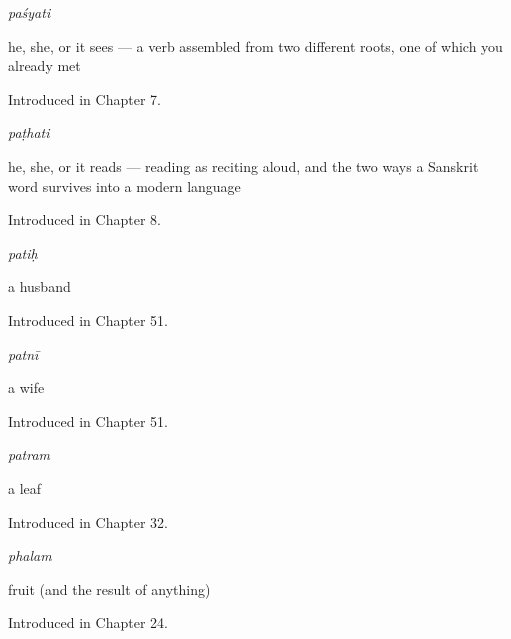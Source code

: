 \noindent\begin{minipage}[t]{\linewidth}
\raggedright
\textbf{}\enspace\emph{paśyati}\par
\small he, she, or it sees — a verb assembled from two different roots, one of which you already met\par
\footnotesize Introduced in Chapter 7.
\end{minipage}\par\medskip

\noindent\begin{minipage}[t]{\linewidth}
\raggedright
\textbf{}\enspace\emph{paṭhati}\par
\small he, she, or it reads — reading as reciting aloud, and the two ways a Sanskrit word survives into a modern language\par
\footnotesize Introduced in Chapter 8.
\end{minipage}\par\medskip

\noindent\begin{minipage}[t]{\linewidth}
\raggedright
\textbf{}\enspace\emph{patiḥ}\par
\small a husband\par
\footnotesize Introduced in Chapter 51.
\end{minipage}\par\medskip

\noindent\begin{minipage}[t]{\linewidth}
\raggedright
\textbf{}\enspace\emph{patnī}\par
\small a wife\par
\footnotesize Introduced in Chapter 51.
\end{minipage}\par\medskip

\noindent\begin{minipage}[t]{\linewidth}
\raggedright
\textbf{}\enspace\emph{patram}\par
\small a leaf\par
\footnotesize Introduced in Chapter 32.
\end{minipage}\par\medskip

\noindent\begin{minipage}[t]{\linewidth}
\raggedright
\textbf{}\enspace\emph{phalam}\par
\small fruit (and the result of anything)\par
\footnotesize Introduced in Chapter 24.
\end{minipage}\par\medskip


